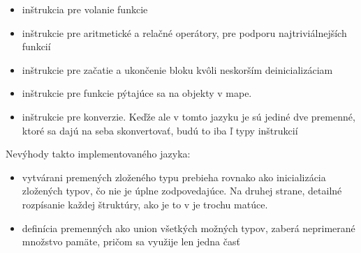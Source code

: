\begin{itemize}
\item inštrukcia pre volanie funkcie
\item inštrukcie pre aritmetické a relačné operátory, pre podporu najtriviálnejších funkcií
\item inštrukcie pre začatie a ukončenie bloku kvôli neskorším deinicializáciam
\item inštrukcie pre funkcie pýtajúce sa na objekty v mape.
\item inštrukcie pre konverzie. Keďže ale v tomto jazyku je sú jediné dve premenné, ktoré sa dajú na seba skonvertovať, budú to iba ľ typy inštrukcií
\end{itemize}
Nevýhody takto implementovaného jazyka:
\begin{itemize}
\item vytvárani premených zloženého typu prebieha rovnako ako inicializácia zložených typov, čo nie je úplne zodpovedajúce. Na druhej strane, detailné rozpísanie každej štruktúry, ako je to v je trochu matúce.\\
\item definícia premenných ako union všetkých možných typov, zaberá neprimerané množstvo pamäte, pričom sa využije len jedna časť
\end{itemize}
